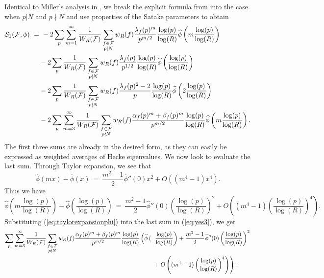 \documentclass[11pt, reqno]{amsart}
\theoremstyle{definition}
\theoremstyle{remark}
\numberwithin{equation}{section}
\renewcommand{\hat}{\widehat}
\begin{document}
 Identical to Miller's analysis in \cite{Miller2009_LOTerms_1LevelDensity}, we break the explicit formula from \cite{ILS2} into the case when $p|N$ and $p\nmid N$ and use properties of the Satake parameters to obtain
\begin{align}
\mathcal{S}_1({\mathcal{F}},\phi)\ =&\ -2\sum_p\sum_{m=1}^{\infty}\frac{1}{W_R(\mathcal{F})}\sum_{\substack{f \in \mathcal{F} \notag \\p|N}}w_R(f)\frac{\lambda_f(p)^m}{p^{m/2}}\frac{\log(p)}{\log(R)}\hat{\phi}\left(m \frac{\log(p)}{\log(R)} \right) \notag \\
&-2\sum_p\frac{1}{W_R(\mathcal{F})}\sum_{\substack{f \in \mathcal{F} \notag \\p \nmid N}}w_R(f)\frac{\lambda_f(p)}{p^{1/2}}\frac{\log(p)}{\log(R)}\hat{\phi}\left(\frac{\log(p)}{\log(R)} \right) \notag \\
&-2\sum_p\frac{1}{W_R(\mathcal{F})}\sum_{\substack{f \in \mathcal{F}\\p \nmid N}}w_R(f)\frac{\lambda_f(p)^2-2}{p}\frac{\log(p)}{\log(R)}\hat{\phi}\left(2\frac{\log(p)}{\log(R)} \right) \notag
\\
&-2\sum_p\sum_{m=3}^{\infty}\frac{1}{W_R(\mathcal{F})}\sum_{\substack{f \in \mathcal{F}\\p \nmid N}}w_R(f)\frac{\alpha_f(p)^m+\beta_f(p)^m}{p^{m/2}}\frac{\log(p)}{\log(R)}\hat{\phi}\left(m \frac{\log(p)}{\log(R)} \right)\label{eq:yes3}.
\end{align}
The first three sums are already in the desired form, as they can easily be expressed as weighted averages of Hecke eigenvalues. We now look to evaluate the last sum. Through Taylor expansion, we see that 
\begin{equation}
   \hat{\phi}(mx)-\hat{\phi}(x)\ =\ \frac{m^2-1}{2}\hat{\phi}''(0)x^2+O\left((m^4-1)x^4 \right). 
\end{equation}
Thus we have 
\begin{equation}\label{eq:taylorexpansionphi}
    \hat{\phi}\left(m\frac{\log(p)}{\log(R)}\right)-\hat{\phi}\left(\frac{\log(p)}{\log(R)}\right)\ =\ \frac{m^2-1}{2}\hat{\phi}''(0)\left( \frac{\log(p)}{\log(R)}\right)^2+O\left((m^4-1)\left(\frac{\log(p)}{\log(R)} \right)^4 \right).
\end{equation}
Substituting (\ref{eq:taylorexpansionphi}) into the last sum in (\ref{eq:yes3}), we get
\begin{align}\label{eq:S1 first}
  \sum_p\sum_{m=3}^{\infty}\frac{1}{W_R(\mathcal{F})}\sum_{\substack{f \in \mathcal{F}\\p \nmid N}}w_R(f)\frac{\alpha_f(p)^{m}+\beta_f(p)^{m}}{p^{m/2}} \frac{\log(p)}{\log(R)}\left(\hat{\phi} \left(\right. \right. &\left. \left. \frac{\log(p)}{\log(R)} \right)+\frac{m^2-1}{2}\hat{\phi}''(0)\left( \frac{\log(p)}{\log(R)}\right)^2 \right. \notag \\ &+\left. O\left((m^4-1)\left(\frac{\log(p)}{\log(R)} \right)^4 \right) \right). 
\end{align}
\end{document}
